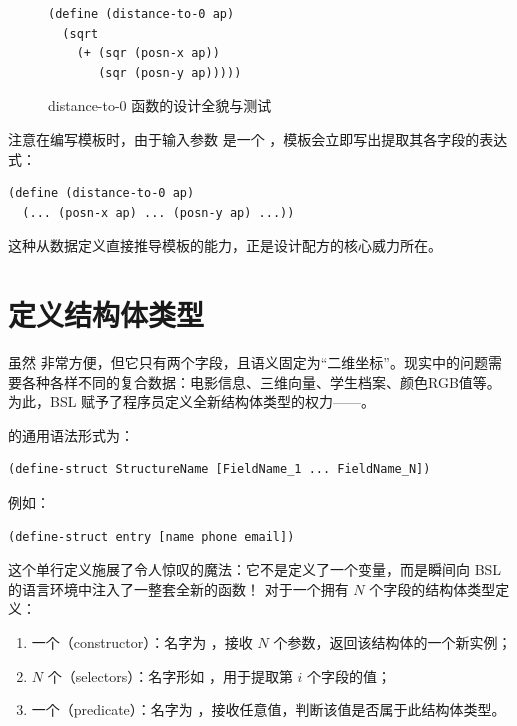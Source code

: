\begin{figure}[htbp]
  \centering
\begin{lstlisting}[language=BSL]
(define (distance-to-0 ap)
  (sqrt
    (+ (sqr (posn-x ap))
       (sqr (posn-y ap)))))
\end{lstlisting}
  \caption{distance-to-0 函数的设计全貌与测试}
  \label{fig:distance_to_0_design}
\end{figure}

注意在编写模板时，由于输入参数  是一个 ，模板会立即写出提取其各字段的表达式：
\begin{lstlisting}[language=BSL]
(define (distance-to-0 ap)
  (... (posn-x ap) ... (posn-y ap) ...))
\end{lstlisting}
这种从数据定义直接推导模板的能力，正是设计配方的核心威力所在。

\section{定义结构体类型}
\label{sec:5.4_defining_structure_types}

虽然  非常方便，但它只有两个字段，且语义固定为“二维坐标”。现实中的问题需要各种各样不同的复合数据：电影信息、三维向量、学生档案、颜色RGB值等。为此，BSL 赋予了程序员定义全新结构体类型的权力——。

 的通用语法形式为：

\begin{lstlisting}[language=BSL]
(define-struct StructureName [FieldName_1 ... FieldName_N])
\end{lstlisting}

例如：
\begin{lstlisting}[language=BSL]
(define-struct entry [name phone email])
\end{lstlisting}

这个单行定义施展了令人惊叹的魔法：它不是定义了一个变量，而是瞬间向 BSL 的语言环境中注入了一整套全新的函数！
对于一个拥有 $N$ 个字段的结构体类型定义：
\begin{enumerate}
  \item 一个（constructor）：名字为 ，接收 $N$ 个参数，返回该结构体的一个新实例；
  \item $N$ 个（selectors）：名字形如 ，用于提取第 $i$ 个字段的值；
  \item 一个（predicate）：名字为 ，接收任意值，判断该值是否属于此结构体类型。
\end{enumerate}

